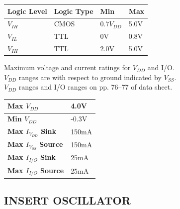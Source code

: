 \documentclass[10pt, letterpaper]{article}
\begin{document}
            \begin{center}
            \begin{tabular}{llll}
            
                \toprule
                \textbf{Logic Level} & \textbf{Logic Type} & \textbf{Min} & \textbf{Max} \\
                \midrule
                $V_{IH}$ & CMOS & $0.7V_{DD}$ & 5.0V \\
                \midrule
                $V_{IL}$ & TTL & 0V & 0.8V \\
                \midrule
                $V_{IH}$ & TTL & 2.0V & 5.0V \\
                \bottomrule

            \end{tabular}
            \end{center}

            \begin{flushleft}
            Maximum voltage and current ratings for $V_{DD}$ and I/O. \\
            $V_{DD}$ ranges are with respect to ground indicated by $V_{SS}$. \\
            $V_{DD}$ ranges and I/O ranges on pp. 76--77 of data sheet. \\
            \end{flushleft}

            \begin{center}
            \begin{tabular}{ll}
        
            \toprule
            \textbf{Max $V_{DD}$} & 4.0V \\
            \midrule
            \textbf{Min $V_{DD}$} & -0.3V \\
            \midrule
            \textbf{Max $I_{V_{DD}}$ Sink} & 150mA \\ 
            \midrule
            \textbf{Max $I_{V_{SS}}$ Source} & 150mA\\
            \midrule
            \textbf{Max $I_{I/O}$ Sink} & 25mA\\
            \midrule
            \textbf{Max $I_{I/O}$ Source} & 25mA\\
            \bottomrule
            

            \end{tabular}
            \end{center}

    \subsection{INSERT OSCILLATOR}
            
\end{document}
